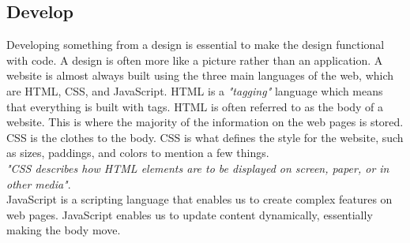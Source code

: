 





\subsection{Develop}%
\label{sub:Develop}
Developing something from a design is essential to make the design functional with code. A design is often more like a picture rather than an application. A website is almost always built using the three main languages of the web, which are HTML, CSS, and JavaScript. HTML is a \textit{"tagging"} language which means that everything is built with tags. HTML is often referred to as the body of a website. This is where the majority of the information on the web pages is stored.
CSS is the clothes to the body. CSS is what defines the style for the website, such as sizes, paddings, and colors to mention a few things.\\ 
\textit{"CSS describes how HTML elements are to be displayed on screen, paper, or in other media"}\cite{CSSIntroduction}.\\
JavaScript is a scripting language that enables us to create complex features on web pages. JavaScript enables us to update content dynamically, essentially making the body move.






